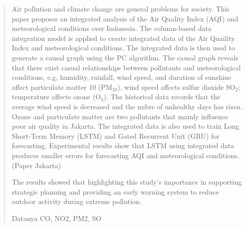 \documentclass[review,12pt]{elsarticle}
\begin{document}
\begin{frontmatter}
\begin{abstract}
Air pollution and climate change are general problems for society. This paper proposes an integrated analysis of the Air Quality Index (AQI) and meteorological conditions over Indonesia. The column-based data integration model is applied to create integrated data of the Air Quaility Index and meteorological conditions. The integrated data is then used to generate a causal graph using the PC algorithm. The causal graph reveals that there exist casual relationships between pollutants and meteorological conditions, e.g, humidity, rainfall, wind speed, and duration of sunshine affect particulate matter 10 (PM$_{10}$), wind speed affects sulfur dioxide SO$_{2}$; temperature affects ozone (O$_{3}$). The historical data records that the average wind speed is decreased and the nubre of unhealthy days has risen. Ozone and particulate matter are two pollutants that mainly influence poor air quality in Jakarta. The integrated data is also used to train Long Short-Term Memory (LSTM) and Gated Recurrent Unit (GRU) for forecasting. Experimental results show that LSTM using integrated data produces smaller errors for forecasting AQI and meteorological conditions. (Paper Jakarta)

The results showed that
highlighting this study's importance in supporting strategic planning and providing an early warning system to reduce outdoor activity during extreme pollution.

Datanya CO, NO2, PM2, SO


\end{abstract}
\end{frontmatter}
\end{document}
